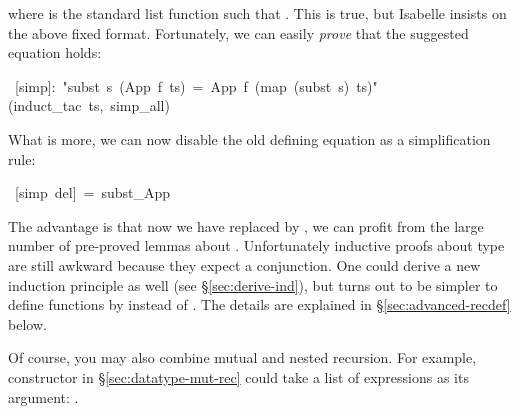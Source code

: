 \begin{isabelle}
\begin{isamarkuptext}
\begin{quote}
\end{quote}
where  is the standard list function such that
. This is true, but Isabelle insists
on the above fixed format. Fortunately, we can easily \emph{prove} that the
suggested equation holds:%
\end{isamarkuptext}%
\ [simp]:\ {"}subst\ s\ (App\ f\ ts)\ =\ App\ f\ (map\ (subst\ s)\ ts){"}\isanewline
{}(induct\_tac\ ts,\ simp\_all)%
\begin{isamarkuptext}%
\noindent
What is more, we can now disable the old defining equation as a
simplification rule:%
\end{isamarkuptext}%
\ [simp\ del]\ =\ subst\_App%
\begin{isamarkuptext}%
\noindent
The advantage is that now we have replaced  by
, we can profit from the large number of pre-proved lemmas
about .  Unfortunately inductive proofs about type
 are still awkward because they expect a conjunction. One
could derive a new induction principle as well (see
\S\ref{sec:derive-ind}), but turns out to be simpler to define
functions by  instead of .
The details are explained in \S\ref{sec:advanced-recdef} below.

Of course, you may also combine mutual and nested recursion. For example,
constructor  in \S\ref{sec:datatype-mut-rec} could take a list of
expressions as its argument: .%
\end{isamarkuptext}%
\end{isabelle}%
